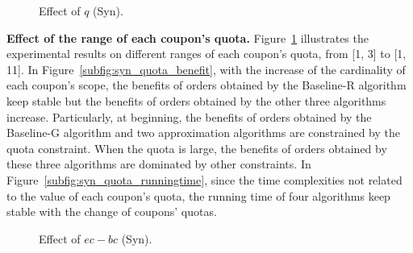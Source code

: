 \begin{figure}[t!]\centering
	\subfigcapskip=-5pt
		\vspace{1ex}
	\vspace{-2ex}
	\addtocounter{subfigure}{-1}
	\figureCaptionMargin
		\vspace{1ex}
	\caption{\small Effect of $q$ (Syn).}\figureBelowMargin
	\label{fig:syn_quota}
\end{figure}

\textbf{Effect of the range of each coupon's quota.} Figure~\ref{fig:syn_quota} illustrates the experimental results on different ranges of each coupon's quota, from [1, 3] to [1, 11]. In Figure~\ref{subfig:syn_quota_benefit}, with the increase of the cardinality of each coupon's scope, the benefits of orders obtained by the Baseline-R algorithm keep stable but the benefits of orders obtained by the other three algorithms increase. Particularly, at beginning, the benefits of orders obtained by the Baseline-G algorithm and two approximation algorithms are constrained by the quota constraint. When the quota is large, the benefits of orders obtained by these three algorithms are dominated by other constraints. In Figure~\ref{subfig:syn_quota_runningtime}, since the time complexities not related to the value of each coupon's quota, the running time of four algorithms keep stable with the change of coupons' quotas. 

\begin{figure}[t!]\centering
	\subfigcapskip=-5pt
	\vspace{-2ex}
	\addtocounter{subfigure}{-1}
	\figureCaptionMargin
	\vspace{1ex}
	\caption{\small Effect of $ec-bc$ (Syn).}\figureBelowMargin
	\label{fig:syn_c_wait}
\end{figure}

